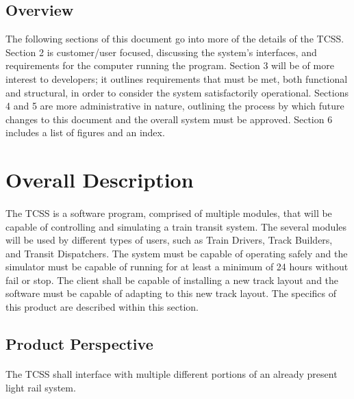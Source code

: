 \documentclass{article}
\begin{document}
    \subsection{Overview}
    The following sections of this document go into more of the details of the TCSS. Section 2 is customer/user focused, discussing the system's interfaces, and requirements for the computer running the program. Section 3 will be of more interest to developers; it outlines requirements that must be met, both functional and structural, in order to consider the system satisfactorily operational. Sections 4 and 5 are more administrative in nature, outlining the process by which future changes to this document and the overall system must be approved. Section 6 includes a list of figures and an index.

    
\section{Overall Description}
\paragraph{}
The TCSS is a software program, comprised of multiple modules, that will be capable of controlling and simulating a train transit system. The several modules will be used by different types of users, such as Train Drivers, Track Builders, and Transit Dispatchers. The system must be capable of operating safely and the simulator must be capable of running for at least a minimum of 24 hours without fail or stop. The client shall be capable of installing a new track layout and the software must be capable of adapting to this new track layout. The specifics of this product are described within this section.
    
    \subsection{Product Perspective}
    \paragraph{}
    
    The TCSS shall interface  with multiple different portions of an already present light rail system. 
    
\end{document}
